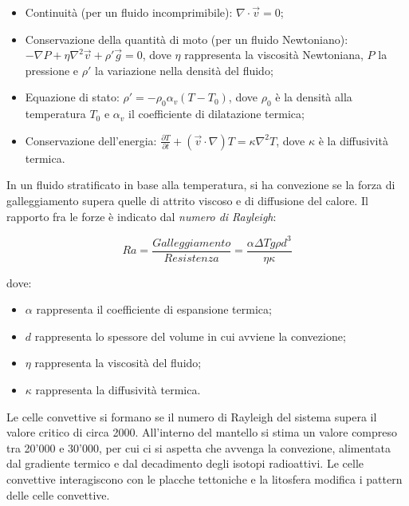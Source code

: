 \documentclass[a4paper,12pt]{book}
\begin{document}
\begin{itemize}
    \item Continuità (per un fluido incomprimibile): $\nabla \cdot \vec{v} = 0 $;
    \item Conservazione della quantità di moto (per un fluido Newtoniano): $- \nabla P + \eta \nabla^2 \vec{v} + \rho' \vec{g} = 0$, dove $\eta$ rappresenta la viscosità Newtoniana, $P$ la pressione e $\rho'$ la variazione nella densità del fluido;
    \item Equazione di stato: $\rho' = - \rho_0 \alpha_v (T - T_0)$, dove $\rho_0$ è la densità alla temperatura $T_0$ e $\alpha_v$ il coefficiente di dilatazione termica;
    \item Conservazione dell'energia: $\frac{\partial T}{\partial t} + (\vec{v} \cdot \nabla) T = \kappa \nabla^2 T$, dove $\kappa$ è la diffusività termica.
\end{itemize}

\noindent In un fluido stratificato in base alla temperatura, si ha convezione se la forza di galleggiamento supera quelle di attrito viscoso e di diffusione del calore.
Il rapporto fra le forze è indicato dal \textit{numero di Rayleigh}:

\begin{equation}
    Ra = \frac{Galleggiamento}{Resistenza} = \frac{\alpha \Delta T g \rho d^3}{\eta \kappa}
    \label{eq:Rayleigh}
\end{equation}

dove:
\begin{itemize}
    \item $\alpha$ rappresenta il coefficiente di espansione termica;
    \item $d$ rappresenta lo spessore del volume in cui avviene la convezione;
    \item $\eta$ rappresenta la viscosità del fluido;
    \item $\kappa$ rappresenta la diffusività termica.
\end{itemize}

\noindent Le celle convettive si formano se il numero di Rayleigh del sistema supera il valore critico di circa 2000.
All'interno del mantello si stima un valore compreso tra 20'000 e 30'000, per cui ci si aspetta che avvenga la convezione, alimentata dal gradiente termico e dal decadimento degli isotopi radioattivi.
Le celle convettive interagiscono con le placche tettoniche e la litosfera modifica i pattern delle celle convettive.\\
\end{document}
